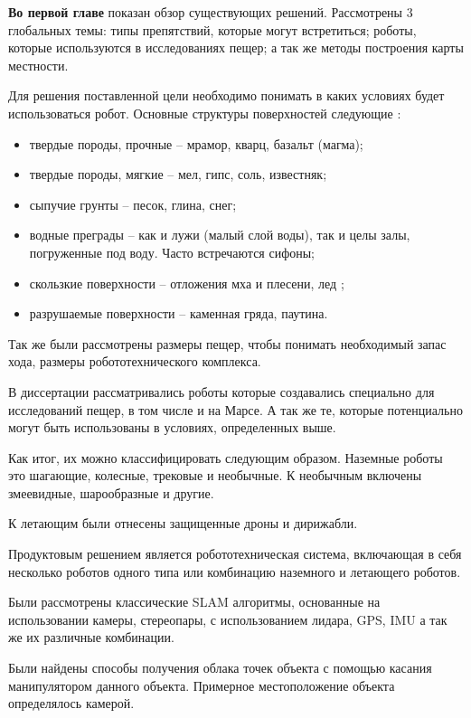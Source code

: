 
\textbf{{Во первой главе}} показан обзор существующих решений. Рассмотрены 3 глобальных темы: типы препятствий, которые могут встретиться; роботы, которые используются в исследованиях пещер; а так же методы построения карты местности.

Для решения поставленной цели необходимо понимать в каких условиях будет использоваться робот. Основные структуры поверхностей следующие :
\begin{itemize}
    \item твердые породы, прочные -- мрамор, кварц, базальт (магма);
    \item твердые породы, мягкие -- мел, гипс, соль, известняк;
    \item сыпучие грунты -- песок, глина, снег;
    \item водные преграды -- как и лужи (малый слой воды), так и целы залы, погруженные под воду. Часто встречаются сифоны;
    \item скользкие поверхности -- отложения мха и плесени, лед ;
    \item разрушаемые поверхности -- каменная гряда, паутина.
\end{itemize}



Так же были рассмотрены размеры пещер, чтобы понимать необходимый запас хода, размеры робототехнического комплекса.

В диссертации рассматривались роботы которые создавались специально для исследований пещер, в том числе и на Марсе. А так же те, которые потенциально могут быть использованы в условиях, определенных выше.

Как итог, их можно классифицировать следующим образом. Наземные роботы это шагающие, колесные, трековые и необычные. К необычным включены змеевидные, шарообразные и другие.

К летающим были отнесены защищенные дроны и дирижабли.

Продуктовым решением является робототехническая система, включающая в себя несколько роботов одного типа или комбинацию наземного и летающего роботов.

Были рассмотрены классические SLAM алгоритмы, основанные на использовании камеры, стереопары, с использованием лидара, GPS, IMU а так же их различные комбинации.

Были найдены способы получения облака точек объекта с помощью касания манипулятором данного объекта. Примерное местоположение объекта определялось камерой.


